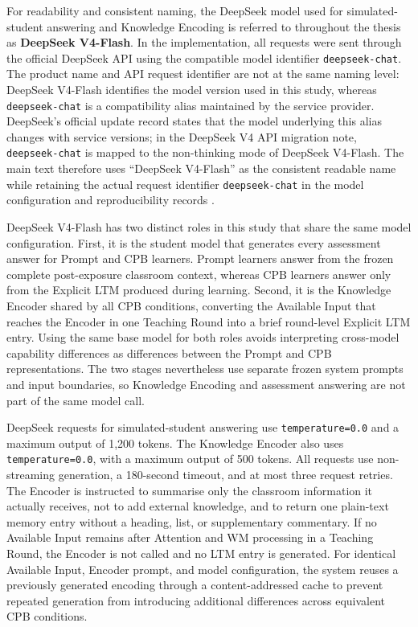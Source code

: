 For readability and consistent naming, the DeepSeek model used for simulated-student answering and Knowledge Encoding is referred to throughout the thesis as \textbf{DeepSeek V4-Flash}. In the implementation, all requests were sent through the official DeepSeek API using the compatible model identifier \texttt{deepseek-chat}. The product name and API request identifier are not at the same naming level: DeepSeek V4-Flash identifies the model version used in this study, whereas \texttt{deepseek-chat} is a compatibility alias maintained by the service provider. DeepSeek's official update record states that the model underlying this alias changes with service versions; in the DeepSeek V4 API migration note, \texttt{deepseek-chat} is mapped to the non-thinking mode of DeepSeek V4-Flash. The main text therefore uses ``DeepSeek V4-Flash'' as the consistent readable name while retaining the actual request identifier \texttt{deepseek-chat} in the model configuration and reproducibility records \cite{deepseek2026api}.

DeepSeek V4-Flash has two distinct roles in this study that share the same model configuration. First, it is the student model that generates every assessment answer for Prompt and CPB learners. Prompt learners answer from the frozen complete post-exposure classroom context, whereas CPB learners answer only from the Explicit LTM produced during learning. Second, it is the Knowledge Encoder shared by all CPB conditions, converting the Available Input that reaches the Encoder in one Teaching Round into a brief round-level Explicit LTM entry. Using the same base model for both roles avoids interpreting cross-model capability differences as differences between the Prompt and CPB representations. The two stages nevertheless use separate frozen system prompts and input boundaries, so Knowledge Encoding and assessment answering are not part of the same model call.

DeepSeek requests for simulated-student answering use \texttt{temperature=0.0} and a maximum output of 1,200 tokens. The Knowledge Encoder also uses \texttt{temperature=0.0}, with a maximum output of 500 tokens. All requests use non-streaming generation, a 180-second timeout, and at most three request retries. The Encoder is instructed to summarise only the classroom information it actually receives, not to add external knowledge, and to return one plain-text memory entry without a heading, list, or supplementary commentary. If no Available Input remains after Attention and WM processing in a Teaching Round, the Encoder is not called and no LTM entry is generated. For identical Available Input, Encoder prompt, and model configuration, the system reuses a previously generated encoding through a content-addressed cache to prevent repeated generation from introducing additional differences across equivalent CPB conditions.

